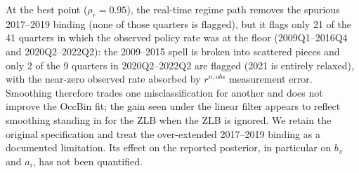 \documentclass[11pt]{article}
\begin{document}
At the best point ($\rho_r=0.95$), the real-time regime path removes the
spurious 2017--2019 binding (none of those quarters is flagged), but it
flags only 21 of the 41 quarters in which the observed policy rate was at
the floor (2009Q1--2016Q4 and 2020Q2--2022Q2): the 2009--2015 spell is
broken into scattered pieces and only 2 of the 9 quarters in 2020Q2--2022Q2
are flagged (2021 is entirely relaxed), with the near-zero observed rate
absorbed by $r^{n,obs}$ measurement error. Smoothing therefore trades one
misclassification for another and does not improve the OccBin fit; the
gain seen under the linear filter appears to reflect smoothing standing in
for the ZLB when the ZLB is ignored. We retain the original specification
and treat the over-extended 2017--2019 binding as a documented
limitation. Its effect on the reported posterior, in particular on
$b_\pi$ and $a_i$, has not been quantified.
\end{document}
